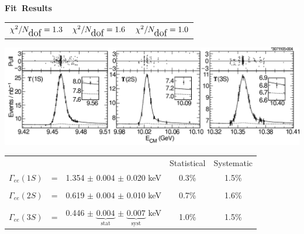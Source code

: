 \documentclass[landscape]{article}
\newenvironment{slide}[1][ ]{\mbox{\bf #1 } \vfill}{\vfill \mbox{ } \hfill \Large \arabic{page} \pagebreak}
\newcommand{\subs}[1]{{\mbox{\large #1}}}
\begin{document}
\begin{slide}[Fit Results]
\begin{center}

{\Large \boldmath
\hspace{0.5 cm} \begin{tabular}{c c c}
  $\chi^2/N_\subs{dof} = 1.3$ \mbox{\hspace{4.2 cm}} & $\chi^2/N_\subs{dof} = 1.6$ & \mbox{\hspace{4.2 cm}} $\chi^2/N_\subs{dof} = 1.0$
\end{tabular}}
\includegraphics[width=\linewidth]{fits}

\vspace{1.2 cm}
\renewcommand{\arraystretch}{1.2}
\begin{tabular}{c c c c c}
  & & & Statistical & Systematic \\
  \boldmath $\Gamma_{ee}(1S)$ & \mbox{\hspace{0.25 cm}} = \mbox{\hspace{0.25 cm}} & 1.354 $\pm$ 0.004 $\pm$ 0.020 keV & 0.3\% & 1.5\% \\
  & & & \\
  \boldmath $\Gamma_{ee}(2S)$ & = & 0.619 $\pm$ 0.004 $\pm$ 0.010 keV & 0.7\% & 1.6\% \\
  & & & \\
  \boldmath $\Gamma_{ee}(3S)$ & = & 0.446 $\pm$ $\underbrace{\mbox{0.004}}_{\mbox{stat}}$ $\pm$ $\underbrace{\mbox{0.007}}_{\mbox{syst}}$ keV & 1.0\% & 1.5\%
\end{tabular}

\end{center}
\end{slide}
\end{document}

